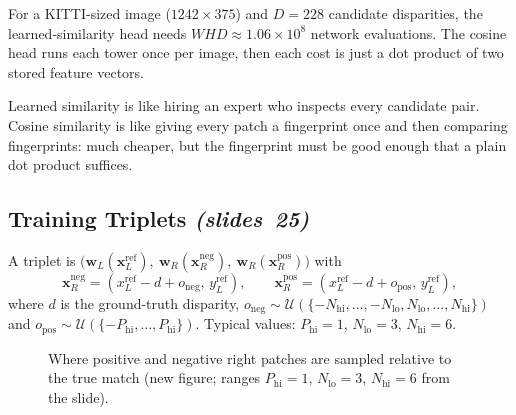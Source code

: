 \documentclass[11pt,a4paper]{article}
\newcommand{\slr}[1]{\texorpdfstring{\emph{(slides~#1)}}{(slides #1)}}
\newcommand{\wL}{\bm{w}_L}
\newcommand{\wR}{\bm{w}_R}
\theoremstyle{definition}
\begin{document}
\begin{Example}
For a KITTI-sized image ($1242\times375$) and $D=228$ candidate disparities, the learned-similarity head needs $WHD\approx1.06\times10^{8}$ network evaluations. The cosine head runs each tower once per image, then each cost is just a dot product of two stored feature vectors.
\end{Example}
\begin{intuition}
Learned similarity is like hiring an expert who inspects every candidate pair. Cosine similarity is like giving every patch a fingerprint once and then comparing fingerprints: much cheaper, but the fingerprint must be good enough that a plain dot product suffices.
\end{intuition}

\subsection{Training Triplets \slr{25}}
\begin{Definition}
A triplet is $\bigl(\wL(\bm x_L^{\mathrm{ref}}),\ \wR(\bm x_R^{\mathrm{neg}}),\ \wR(\bm x_R^{\mathrm{pos}})\bigr)$ with
\[
\bm x_R^{\mathrm{neg}}=(x_L^{\mathrm{ref}}-d+o_{\mathrm{neg}},\,y_L^{\mathrm{ref}}),\qquad
\bm x_R^{\mathrm{pos}}=(x_L^{\mathrm{ref}}-d+o_{\mathrm{pos}},\,y_L^{\mathrm{ref}}),
\]
where $d$ is the ground-truth disparity, $o_{\mathrm{neg}}\sim\mathcal U(\{-N_{\mathrm{hi}},\dots,-N_{\mathrm{lo}},N_{\mathrm{lo}},\dots,N_{\mathrm{hi}}\})$ and $o_{\mathrm{pos}}\sim\mathcal U(\{-P_{\mathrm{hi}},\dots,P_{\mathrm{hi}}\})$. Typical values: $P_{\mathrm{hi}}=1$, $N_{\mathrm{lo}}=3$, $N_{\mathrm{hi}}=6$.
\end{Definition}
\begin{figure}[H]\centering
{}
\caption{Where positive and negative right patches are sampled relative to the true match (new figure; ranges $P_{\mathrm{hi}}=1$, $N_{\mathrm{lo}}=3$, $N_{\mathrm{hi}}=6$ from the slide).}
\end{figure}
\end{document}
